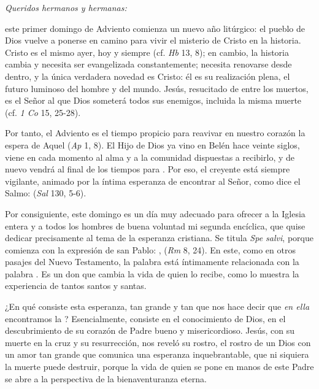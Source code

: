 
\begin{body} 
	\emph{Queridos hermanos y hermanas:} 
	
	 este primer domingo de Adviento comienza un nuevo año litúrgico: el pueblo de Dios vuelve a ponerse en camino para vivir el misterio de Cristo en la historia. Cristo es el mismo ayer, hoy y siempre (cf. \emph{Hb} 13, 8); en cambio, la historia cambia y necesita ser evangelizada constantemente; necesita renovarse desde dentro, y la única verdadera novedad es Cristo: él es su realización plena, el futuro luminoso del hombre y del mundo. Jesús, resucitado de entre los muertos, es el Señor al que Dios someterá todos sus enemigos, incluida la misma muerte (cf. \emph{1 Co} 15, 25-28). 
	
	Por tanto, el Adviento es el tiempo propicio para reavivar en nuestro corazón la espera de Aquel  (\emph{Ap} 1, 8). El Hijo de Dios ya vino en Belén hace veinte siglos, viene en cada momento al alma y a la comunidad dispuestas a recibirlo, y de nuevo vendrá al final de los tiempos para . Por eso, el creyente está siempre vigilante, animado por la íntima esperanza de encontrar al Señor, como dice el Salmo:  (\emph{Sal} 130, 5-6). 
	
	Por consiguiente, este domingo es un día muy adecuado para ofrecer a la Iglesia entera y a todos los hombres de buena voluntad mi segunda encíclica, que quise dedicar precisamente al tema de la esperanza cristiana. Se titula \emph{Spe salvi}, porque comienza con la expresión de san Pablo: \emph{},  (\emph{Rm} 8, 24). En este, como en otros pasajes del Nuevo Testamento, la palabra  está íntimamente relacionada con la palabra . Es un don que cambia la vida de quien lo recibe, como lo muestra la experiencia de tantos santos y santas. 
	
	¿En qué consiste esta esperanza, tan grande y tan  que nos hace decir que \emph{en ella} encontramos la ? Esencialmente, consiste en el conocimiento de Dios, en el descubrimiento de su corazón de Padre bueno y misericordioso. Jesús, con su muerte en la cruz y su resurrección, nos reveló su rostro, el rostro de un Dios con un amor tan grande que comunica una esperanza inquebrantable, que ni siquiera la muerte puede destruir, porque la vida de quien se pone en manos de este Padre se abre a la perspectiva de la bienaventuranza eterna. 
	

\end{body}
